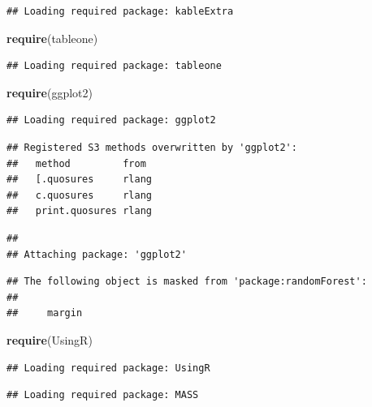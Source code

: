 \documentclass[]{article}
\newenvironment{Shaded}{\begin{snugshade}}{\end{snugshade}}
\newcommand{\KeywordTok}[1]{\textcolor[rgb]{0.13,0.29,0.53}{\textbf{#1}}}
\newcommand{\NormalTok}[1]{#1}
\begin{document}
\begin{verbatim}
## Loading required package: kableExtra
\end{verbatim}

\begin{Shaded}
\begin{Highlighting}[]
\KeywordTok{require}\NormalTok{(tableone)}
\end{Highlighting}
\end{Shaded}

\begin{verbatim}
## Loading required package: tableone
\end{verbatim}

\begin{Shaded}
\begin{Highlighting}[]
\KeywordTok{require}\NormalTok{(ggplot2)}
\end{Highlighting}
\end{Shaded}

\begin{verbatim}
## Loading required package: ggplot2
\end{verbatim}

\begin{verbatim}
## Registered S3 methods overwritten by 'ggplot2':
##   method         from 
##   [.quosures     rlang
##   c.quosures     rlang
##   print.quosures rlang
\end{verbatim}

\begin{verbatim}
## 
## Attaching package: 'ggplot2'
\end{verbatim}

\begin{verbatim}
## The following object is masked from 'package:randomForest':
## 
##     margin
\end{verbatim}

\begin{Shaded}
\begin{Highlighting}[]
\KeywordTok{require}\NormalTok{(UsingR)}
\end{Highlighting}
\end{Shaded}

\begin{verbatim}
## Loading required package: UsingR
\end{verbatim}

\begin{verbatim}
## Loading required package: MASS
\end{verbatim}
\end{document}
